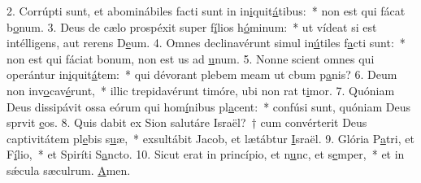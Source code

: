 2. Corrúpti sunt, et abominábiles facti sunt in in\uline{i}quit\uline{á}tibus:~* non est qui fácat b\uline{o}num.
3. Deus de cælo prospéxit super f\uline{í}lios h\uline{ó}minum:~* ut vídeat si est intélligens, aut rerens D\uline{e}um.
4. Omnes declinavérunt simul in\uline{ú}tiles f\uline{a}cti sunt:~* non est qui fáciat bonum, non est us ad \uline{u}num.
5. Nonne scient omnes qui operántur in\uline{i}quit\uline{á}tem:~* qui dévorant plebem meam ut cbum p\uline{a}nis?
6. Deum non inv\uline{o}cav\uline{é}runt,~* illic trepidavérunt timóre, ubi non rat t\uline{i}mor.
7. Quóniam Deus dissipávit ossa eórum qui hom\uline{í}nibus pl\uline{a}cent:~* confúsi sunt, quóniam Deus sprvit \uline{e}os.
8. Quis dabit ex Sion salutáre Israël?~† cum convérterit Deus captivitátem pl\uline{e}bis s\uline{u}æ,~* exsultábit Jacob, et lætábtur \uline{I}sraël.
9. Glória P\uline{a}tri, et F\uline{í}lio,~* et Spiríti S\uline{a}ncto.
10. Sicut erat in princípio, et n\uline{u}nc, et s\uline{e}mper,~* et in sǽcula sæculrum. \uline{A}men.
